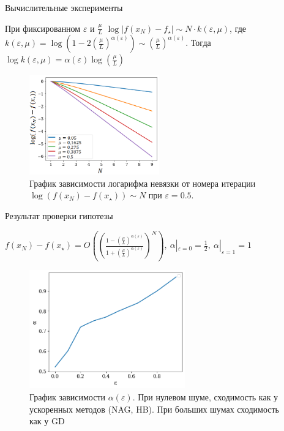 \documentclass{beamer}
\begin{document}
\begin{frame}{Вычислительные эксперименты}

При фиксированном $\varepsilon$ и $\frac{\mu}{L}$ $\log{|f(x_N) - f_{\star}| \sim N \cdot k(\varepsilon, \mu)}$, где $k(\varepsilon, \mu) = \log{\left(1 - 2\left(\frac{\mu}{L}\right)^{\alpha(\varepsilon)}\right)}\sim \left(\frac{\mu}{L}\right)^{\alpha(\varepsilon)}$.
Тогда $\log{k(\varepsilon, \mu)} = \alpha(\varepsilon) \log{\left(\frac{\mu}{L}\right)}$


\begin{figure}
\caption{График зависимости логарифма невязки от номера итерации $\log{(f(x_N) - f(x_{\star}))} \sim N$ при $\varepsilon = 0.5$.}
\includegraphics[width=0.5\textwidth]{linear_convergence.png}
\end{figure}

\end{frame}
\begin{frame}{Результат проверки гипотезы}
\begin{center}

 $f(x_N) - f(x_{\star}) = O\left(\left(\frac{1 - \left(\frac{\mu}{L}\right)^{\alpha(\varepsilon)}}{1 + \left(\frac{\mu}{L}\right)^{\alpha(\varepsilon)}}\right)^N\right),  \
   \alpha|_{\varepsilon = 0} = \frac12, \ \alpha|_{\varepsilon = 1} = 1$ \\ 
\end{center}
\begin{figure}
\caption{График зависимости $\alpha(\varepsilon)$. При нулевом шуме, сходимость как у ускоренных методов (NAG, HB). При больших шумах сходимость как у GD}
\includegraphics[width=0.6\textwidth]{main_res__of_gfom.png}
\end{figure}
\end{frame}
\end{document}
